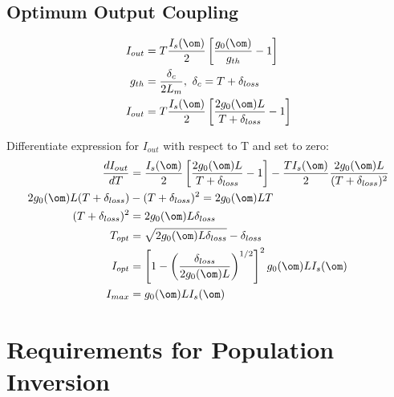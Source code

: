 \documentclass[a4paper, 11pt, normalem]{report}
\begin{document}
\section{Optimum Output Coupling}
\begin{multicols}{2}
\begin{figure}[H]
    \centering
\end{figure}
\begin{align}
    I_{out} &= T\frac{I_s(\om)}{2}\left[\frac{g_0(\om)}{g_{th}}-1\right] \\
    g_{th} &= \frac{\delta_c}{2L_m},~ \delta_c = T+\delta_{loss} \\
    I_{out} &= T\frac{I_s(\om)}{2}\left[\frac{2g_0(\om)L}{T+\delta_{loss}}-1\right]
\end{align}
\end{multicols}
Differentiate expression for $I_{out}$ with respect to T and set to zero:
\begin{align}
    \frac{dI_{out}}{dT} &= \frac{I_s(\om)}{2}\left[\frac{2g_0(\om)L}{T+\delta_{loss}}-1\right] - \frac{TI_s(\om)}{2}\frac{2g_0(\om)L}{(T+\delta_{loss})^2} \\
    2g_0(\om)L(T+\delta_{loss}) &- (T+\delta_{loss})^2 = 2g_0(\om)LT \\
    (T+\delta_{loss})^2 &= 2g_0(\om)L\delta_{loss} \\
    T_{opt} &= \sqrt{2g_0(\om)L\delta_{loss}} - \delta_{loss} \\
    I_{opt} &= \left[1-\left(\frac{\delta_{loss}}{2g_0(\om)L}\right)^{1/2}\right]^2 g_0(\om)LI_s(\om) \\
    I_{max} &= g_0(\om)LI_s(\om)
\end{align}

\chapter{Requirements for Population Inversion}
\end{document}
